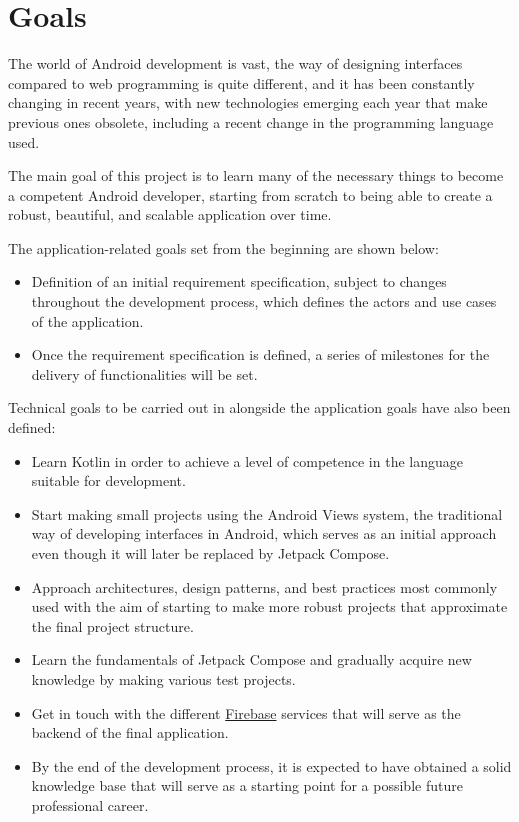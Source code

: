 \section*{Goals}
The world of Android development is vast, the way of designing interfaces compared to web programming is quite different, and it has been constantly changing in recent years, with new technologies emerging each year that make previous ones obsolete, including a recent change in the programming language used.

The main goal of this project is to learn many of the necessary things to become a competent Android developer, starting from scratch to being able to create a robust, beautiful, and scalable application over time.

The application-related goals set from the beginning are shown below:
\begin{itemize}
	\item Definition of an initial requirement specification, subject to changes throughout the development process, which defines the actors and use cases of the application.
	\item Once the requirement specification is defined, a series of milestones for the delivery of functionalities will be set.
\end{itemize}

Technical goals to be carried out in alongside the application goals have also been defined:
\begin{itemize}
	\item Learn Kotlin in order to achieve a level of competence in the language suitable for development.
	\item Start making small projects using the Android Views system, the traditional way of developing interfaces in Android, which serves as an initial approach even though it will later be replaced by Jetpack Compose.
	\item Approach architectures, design patterns, and best practices most commonly used with the aim of starting to make more robust projects that approximate the final project structure.
	\item Learn the fundamentals of Jetpack Compose and gradually acquire new knowledge by making various test projects.
	\item Get in touch with the different \hyperlink{subsec:firebase}{Firebase} services that will serve as the backend of the final application.
	\item By the end of the development process, it is expected to have obtained a solid knowledge base that will serve as a starting point for a possible future professional career.
\end{itemize}

